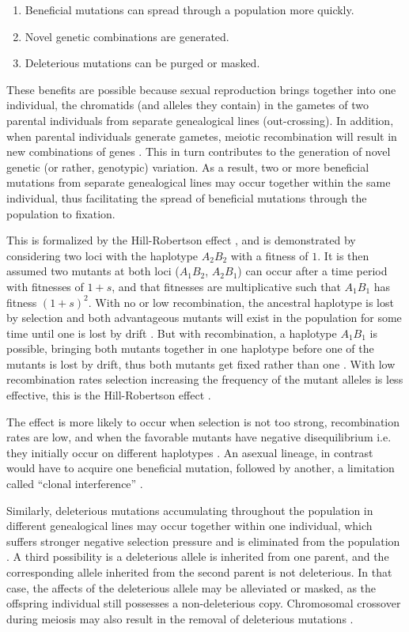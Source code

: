 \begin{enumerate}
\item Beneficial mutations can spread through a population more quickly.
\item Novel genetic combinations are generated.
\item Deleterious mutations can be purged or masked.
\end{enumerate}

These benefits are possible because sexual reproduction brings together into one individual, the chromatids (and alleles they contain) in the gametes of two parental individuals from separate genealogical lines (out-crossing).
In addition, when parental individuals generate gametes, meiotic recombination will result in new combinations of genes \parencite{Felsenstein1976}.
This in turn contributes to the generation of novel genetic (or rather, genotypic) variation.
As a result, two or more beneficial mutations from separate genealogical lines may occur together within the same individual, thus facilitating the spread of beneficial mutations through the population to fixation.

This is formalized by the Hill-Robertson effect \parencite{Hill1966}, and is demonstrated by considering two loci with the haplotype $A_2B_2$ with a fitness of $1$.
It is then assumed two mutants at both loci ($A_1B_2$, $A_2B_1$) can occur after a time period with fitnesses of $1+s$, and that fitnesses are multiplicative such that $A_1B_1$ has fitness $(1+s)^2$.
With no or low recombination, the ancestral haplotype is lost by selection and both advantageous mutants will exist in the population for some time until one is lost by drift \parencite{Coop2007}.
But with recombination, a haplotype $A_1B_1$ is possible, bringing both mutants together in one haplotype before one of the mutants is lost by drift, thus both mutants get fixed rather than one \cite{Coop2007}.
With low recombination rates selection increasing the frequency of the mutant alleles is less effective, this is the Hill-Robertson effect \parencite{Hill1966}.

The effect is more likely to occur when selection is not too strong, recombination rates are low, and when the favorable mutants have negative disequilibrium i.e. they initially occur on different haplotypes \parencite{Hedrick2010}.
An asexual lineage, in contrast would have to acquire one beneficial mutation, followed by another, a limitation called “clonal interference” \parencite{Gerrish1998}.

Similarly, deleterious mutations accumulating throughout the population in different genealogical lines may occur together within one individual, which suffers stronger negative selection pressure and is eliminated from the population \parencite{Crow1994}.
A third possibility is a deleterious allele is inherited from one parent, and the corresponding allele inherited from the second parent is not deleterious.
In that case, the affects of the deleterious allele may be alleviated or masked, as the offspring individual still possesses a non-deleterious copy.
Chromosomal crossover during meiosis may also result in the removal of deleterious mutations \parencite{Crow1994}.

